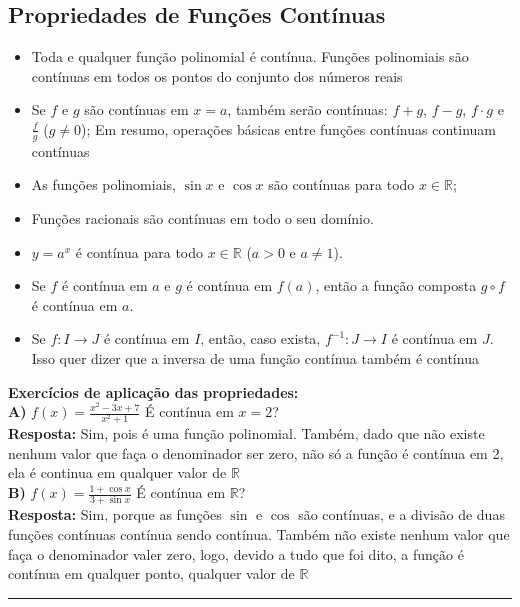 \documentclass{article}
\begin{document}
\subsection{Propriedades de Funções Contínuas}
\begin{itemize}

    \item Toda e qualquer função polinomial é contínua. Funções polinomiais são contínuas em todos os pontos do conjunto dos números reais

    \item Se \( f \) e \( g \) são contínuas em \( x = a \), também serão contínuas: \( f + g \), \( f - g \), \( f \cdot g \) e \( \frac{f}{g} \) (\( g \neq 0 \)); Em resumo, operações básicas entre funções contínuas continuam contínuas
    
    \item As funções polinomiais, \( \sin x \) e \( \cos x \) são contínuas para todo \( x \in \mathbb{R} \);
    
    \item Funções racionais são contínuas em todo o seu domínio.
    
    \item \( y = a^x \) é contínua para todo \( x \in \mathbb{R} \) (\( a > 0 \) e \( a \neq 1 \)).

    \item Se \( f \) é contínua em \( a \) e \( g \) é contínua em \( f(a) \), então a função composta \( g \circ f \) é contínua em \( a \).

    \item Se \( f: I \to J \) é contínua em \( I \), então, caso exista, \( f^{-1}: J \to I \) é contínua em \( J \). Isso quer dizer que a inversa de uma função contínua também é contínua
\end{itemize}
\textbf{Exercícios de aplicação das propriedades:}
\\[10pt]
\textbf{A)} \( f(x) = \frac{x^2 - 3x + 7}{x^2 + 1} \) \quad É contínua em \(x = 2\)?\\[10pt] \textbf{Resposta:} Sim, pois é uma função polinomial. Também, dado que não existe nenhum valor que faça o denominador ser zero, não só a função é contínua em 2, ela é continua em qualquer valor de $\mathbb{R}$
\\[10pt]
\textbf{B)} \( f(x) = \frac{1 + \cos x}{3 + \sin x} \) \quad É contínua em \( \mathbb{R} \)?\\[10pt] \textbf{Resposta:} Sim, porque as funções $\sin$ e $\cos$ são contínuas, e a divisão de duas funções contínuas contínua sendo contínua. Também não existe nenhum valor que faça o denominador valer zero, logo, devido a tudo que foi dito, a função é contínua em qualquer ponto, qualquer valor de $\mathbb{R}$
\vspace{10pt}
\hrule
\end{document}
